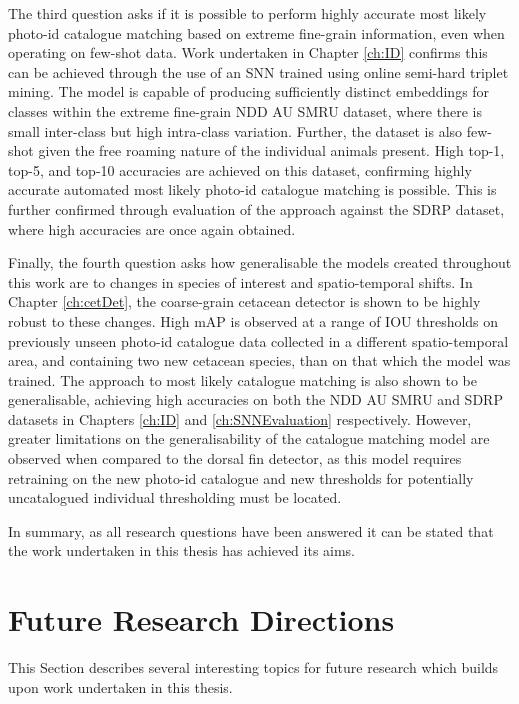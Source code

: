 The third question asks if it is possible to perform highly accurate most likely photo-id catalogue matching based on extreme fine-grain information, even when operating on few-shot data. Work undertaken in Chapter \ref{ch:ID} confirms this can be achieved through the use of an SNN trained using online semi-hard triplet mining. The model is capable of producing sufficiently distinct embeddings for classes within the extreme fine-grain NDD AU SMRU dataset, where there is small inter-class but high intra-class variation. Further, the dataset is also few-shot given the free roaming nature of the individual animals present. High top-1, top-5, and top-10 accuracies are achieved on this dataset, confirming highly accurate automated most likely photo-id catalogue matching is possible. This is further confirmed through evaluation of the approach against the SDRP dataset, where high accuracies are once again obtained. 

Finally, the fourth question asks how generalisable the models created throughout this work are to changes in species of interest and spatio-temporal shifts. In Chapter \ref{ch:cetDet}, the coarse-grain cetacean detector is shown to be highly robust to these changes. High mAP is observed at a range of IOU thresholds on previously unseen photo-id catalogue data collected in a different spatio-temporal area, and containing two new cetacean species, than on that which the model was trained. The approach to most likely catalogue matching is also shown to be generalisable, achieving high accuracies on both the NDD AU SMRU and SDRP datasets in Chapters \ref{ch:ID} and \ref{ch:SNNEvaluation} respectively. However, greater limitations on the generalisability of the catalogue matching model are observed when compared to the dorsal fin detector, as this model requires retraining on the new photo-id catalogue and new thresholds for potentially uncatalogued individual thresholding must be located. 

In summary, as all research questions have been answered it can be stated that the work undertaken in this thesis has achieved its aims. 

\section{Future Research Directions}\label{ch:Conclusion,sec:FutureWork}

This Section describes several interesting topics for future research which builds upon work undertaken in this thesis.

